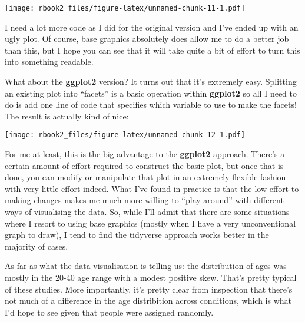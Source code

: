 \documentclass[]{book}
\newenvironment{Shaded}{\begin{snugshade}}{\end{snugshade}}
\newcommand{\DataTypeTok}[1]{\textcolor[rgb]{0.13,0.29,0.53}{#1}}
\newcommand{\KeywordTok}[1]{\textcolor[rgb]{0.13,0.29,0.53}{\textbf{#1}}}
\newcommand{\NormalTok}[1]{#1}
\newcommand{\OperatorTok}[1]{\textcolor[rgb]{0.81,0.36,0.00}{\textbf{#1}}}
\newcommand{\StringTok}[1]{\textcolor[rgb]{0.31,0.60,0.02}{#1}}
\begin{document}
\texttt{[image: rbook2\_files/figure-latex/unnamed-chunk-11-1.pdf]}

I need a lot more code as I did for the original version and I've ended up with an ugly plot. Of course, base graphics absolutely does allow me to do a better job than this, but I hope you can see that it will take quite a bit of effort to turn this into something readable.

What about the \textbf{ggplot2} version? It turns out that it's extremely easy. Splitting an existing plot into ``facets'' is a basic operation within \textbf{ggplot2} so all I need to do is add one line of code that specifies which variable to use to make the facets!
The result is actually kind of nice:

\begin{Shaded}
\end{Shaded}

\texttt{[image: rbook2\_files/figure-latex/unnamed-chunk-12-1.pdf]}

For me at least, this is the big advantage to the \textbf{ggplot2} approach. There's a certain amount of effort required to construct the basic plot, but once that is done, you can modify or manipulate that plot in an extremely flexible fashion with very little effort indeed. What I've found in practice is that the low-effort to making changes makes me much more willing to ``play around'' with different ways of visualising the data. So, while I'll admit that there are some situations where I resort to using base graphics (mostly when I have a very unconventional graph to draw), I tend to find the tidyverse approach works better in the majority of cases.

As far as what the data visualisation is telling us: the distribution of ages was mostly in the 20-40 age range with a modest positive skew. That's pretty typical of these studies. More importantly, it's pretty clear from inspection that there's not much of a difference in the age distribition across conditions, which is what I'd hope to see given that people were assigned randomly.
\end{document}
